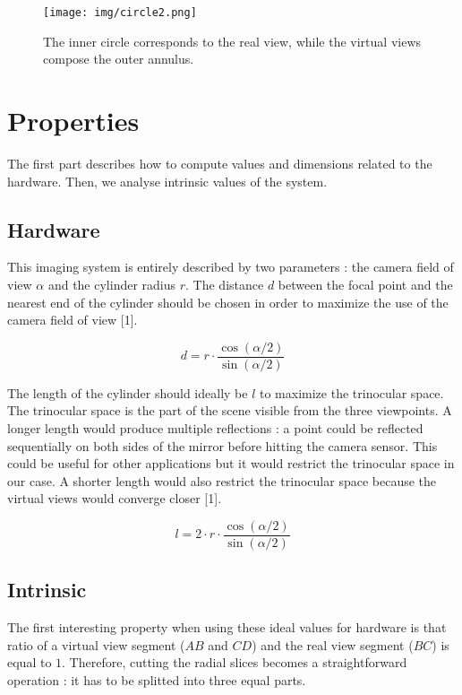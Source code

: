 \documentclass[a4paper,twocolumn,fleqn]{article}
\begin{document}
\begin{figure}[!hb]
  \centering
  \texttt{[image: img/circle2.png]}
  \caption{The inner circle corresponds to the real view, while the virtual views compose the outer annulus.}
\end{figure}

\section{Properties}
The first part describes how to compute values and dimensions related to the hardware. Then, we analyse intrinsic values of the system.

\subsection{Hardware}
This imaging system is entirely described by two parameters : the camera field of view $\alpha$ and the cylinder radius $r$. The distance $d$ between the focal point and the nearest end of the cylinder should be chosen in order to maximize the use of the camera field of view [1].

\begin{equation}
d = r \cdot \frac{\cos{(\alpha/2)}}{\sin{(\alpha/2)}}
\end{equation}

The length of the cylinder should ideally be $l$ to maximize the trinocular space. The trinocular space is the part of the scene visible from the three viewpoints. A longer length would produce multiple reflections : a point could be reflected sequentially on both sides of the mirror before hitting the camera sensor. This could be useful for other applications but it would restrict the trinocular space in our case. A shorter length would also restrict the trinocular space because the virtual views would converge closer [1].

\begin{equation}
l = 2 \cdot r \cdot \frac{\cos{(\alpha/2)}}{\sin{(\alpha/2)}}
\end{equation}

\subsection{Intrinsic}
The first interesting property when using these ideal values for hardware is that ratio of a virtual view segment ($AB$ and $CD$) and the real view segment ($BC$) is equal to $1$. Therefore, cutting the radial slices becomes a straightforward operation : it has to be splitted into three equal parts.
\end{document}

